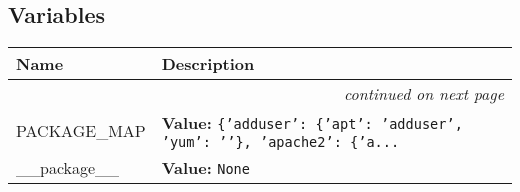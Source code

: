 
  \subsection{Variables}

    \vspace{-1cm}
\hspace{\varindent}\begin{longtable}{|p{\varnamewidth}|p{\vardescrwidth}|l}
\cline{1-2}
\cline{1-2} \centering \textbf{Name} & \centering \textbf{Description}& \\
\cline{1-2}
\endhead\cline{1-2}\multicolumn{3}{r}{\small\textit{continued on next page}}\\\endfoot\cline{1-2}
\endlastfoot\raggedright P\-A\-C\-K\-A\-G\-E\-\_\-M\-A\-P\- & \raggedright \textbf{Value:} 
{\tt \texttt{\{}\texttt{'}\texttt{adduser}\texttt{'}\texttt{: }\texttt{\{}\texttt{'}\texttt{apt}\texttt{'}\texttt{: }\texttt{'}\texttt{adduser}\texttt{'}\texttt{, }\texttt{'}\texttt{yum}\texttt{'}\texttt{: }\texttt{'}\texttt{}\texttt{'}\texttt{\}}\texttt{, }\texttt{'}\texttt{apache2}\texttt{'}\texttt{: }\texttt{\{}\texttt{'}\texttt{a}\texttt{...}}&\\
\cline{1-2}
\raggedright \_\-\_\-p\-a\-c\-k\-a\-g\-e\-\_\-\_\- & \raggedright \textbf{Value:} 
{\tt None}&\\
\cline{1-2}
\end{longtable}

